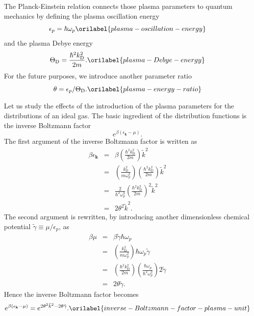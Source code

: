 \documentclass[aps,showkeys,noshowpacs,superscriptaddress,pre,preprint]{revtex4-2}
\let\label\orilabel
\begin{document}
The Planck-Einstein relation connects those plasma parameters 
to quantum mechanics by defining the plasma oscillation energy
\begin{equation}
\epsilon_p = \hbar \omega_p
\label{plasma-oscillation-energy}
\end{equation}
and the plasma Debye energy
\begin{equation}
\Theta_\mathrm{D} = \frac{\hbar^2 k_\mathrm{D}^2}{2m} .
\label{plasma-Debye-energy}
\end{equation}
For the future purposes, we introduce another parameter ratio
\begin{equation}
\theta = \epsilon_p / \Theta_\mathrm{D}.
\label{plasma-energy-ratio}
\end{equation}

Let us study the effects of the introduction of the plasma parameters
for the distributions of an ideal gas.
The basic ingredient of the distribution functions is
the inverse Boltzmann factor
\begin{equation*}
e^{\beta \left( \epsilon_\mathbf{k} - \mu \right)} .
\end{equation*}
The first argument of the inverse Boltzmann factor is written as
\begin{eqnarray}
\beta \epsilon_\mathbf{k} 
&=& \beta \left( \frac{\hbar^2 k_\mathrm{D}^2}{2m} \right) \tilde{k}^2
\nonumber \\
&=& 
\left( \frac{ k_\mathrm{D}^2}{ m \omega_p^2}  \right) 
\left( \frac{\hbar^2 k_\mathrm{D}^2}{2m} \right) \tilde{k}^2
\nonumber \\
&=& \frac{2}{\hbar^2 \omega_p^2} 
\left( \frac{\hbar^2 k_\mathrm{D}^2}{2m} \right)^2 \tilde{k}^2
\nonumber \\
&=& 2 \theta^2 \tilde{k}^2 .
\end{eqnarray}
The second argument is rewritten,
by introducing another dimensionless chemical potential
$\tilde{\gamma} \equiv \mu / \epsilon_p$, as
\begin{eqnarray}
\beta \mu &=& \beta \tilde{\gamma} \hbar \omega_p
\nonumber \\
&=& \left( \frac{ k_\mathrm{D}^2}{ m \omega_p^2}  \right) 
\hbar \omega_p \tilde{\gamma} 
\nonumber \\
&=& \left( \frac{ \hbar^2 k_\mathrm{D}^2 }{2 m} \right)
\left( \frac{\hbar \omega_p}{\hbar^2 \omega_p^2} \right)
2 \tilde{\gamma}
\nonumber \\
&=& 2 \theta \tilde{\gamma} .
\end{eqnarray}
Hence the inverse Boltzmann factor becomes
\begin{equation}
e^{\beta \left( \epsilon_\mathbf{k} - \mu \right)} 
= e^{2 \theta^2 \tilde{k}^2  - 2 \theta \tilde{\gamma}} .
\label{inverse-Boltzmann-factor-plasma-unit}
\end{equation}
\end{document}
